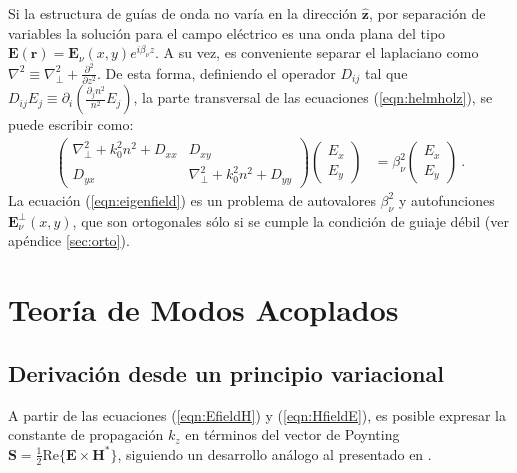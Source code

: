 Si la estructura de guías de onda no varía en la dirección $\hat{\textbf{z}}$, por separación de variables la solución para el campo eléctrico es una onda plana del tipo $\textbf{E}(\textbf{r}) = \textbf{E}_\nu(x, y) e^{i\beta_\nu z}$. A su vez, es conveniente separar el laplaciano como $\nabla^2 \equiv \nabla_\perp^2 + \frac{\partial^2}{\partial z^2}$. De esta forma, definiendo el operador $D_{ij}$ tal que $D_{ij} E_j \equiv \partial_i\left(\frac{\partial_j n^2}{n^2}E_j \right) $, la parte transversal de las ecuaciones (\ref{eqn:helmholz}), se puede escribir como:
\begin{align}
	\begin{pmatrix}
	\nabla_\perp^2  + k_0^2n^2 + D_{xx} & D_{xy} 
	\\
	D_{yx}  & \nabla_\perp^2  + k_0^2n^2 + D_{yy} 
	\end{pmatrix}
	\begin{pmatrix}
	E_x
	\\
	E_y
	\end{pmatrix}
		&=
	\beta_\nu^2 
	\begin{pmatrix}
	E_x
	\\
	E_y
	\end{pmatrix} \ . \label{eqn:eigenfield}
\end{align}
La ecuación (\ref{eqn:eigenfield}) es un problema de autovalores $\beta_\nu^2$ y autofunciones $\textbf{E}_\nu^\perp(x,y)$, que son ortogonales sólo si se cumple la condición de guiaje débil (ver apéndice \ref{sec:orto}). 

\section{Teoría de Modos Acoplados}
\subsection{Derivación desde un principio variacional}

A partir de las ecuaciones (\ref{eqn:EfieldH}) y (\ref{eqn:HfieldE}), es posible expresar la constante de propagación $k_z$ en términos del vector de Poynting $\textbf{S} = \frac{1}{2} \text{Re}\{\textbf{E} \times \textbf{H}^*\}$, siguiendo un desarrollo análogo al presentado en \citep{haus_coupled-mode}. 


